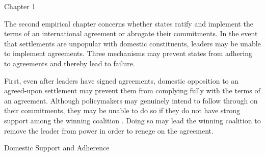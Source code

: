 


Chapter 1















The second empirical chapter concerns whether states ratify and implement the terms of an international agreement or abrogate their commitments. In the event that settlements are unpopular with domestic constituents, leaders may be unable to implement agreements. Three mechanisms may prevent states from adhering to agreements and thereby lead to failure.















First, even after leaders have signed agreements, domestic opposition to an agreed-upon settlement may prevent them from complying fully with the terms of an agreement. Although policymakers may genuinely intend to follow through on their commitments, they may be unable to do so if they do not have strong support among the winning coalition \citep{putnam1988}. Doing so may lead the winning coalition to remove the leader from power in order to renege on the agreement.















\citep{Introduction}















Domestic Support and Adherence















